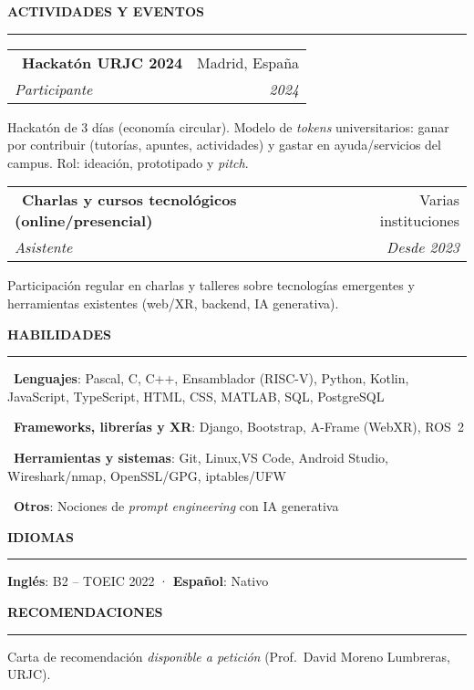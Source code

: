 \documentclass[10pt,a4paper]{article}
\makeatletter
\newcommand{\SectionTitle}[1]{%
	\vspace{5pt}%
	{\bfseries\MakeUppercase{#1}}\par
	\rule{\textwidth}{0.5pt}\vspace{3pt}%
}
\newcommand{\EventEntry}[4]{%
	\begingroup\setlength{\tabcolsep}{0pt}\renewcommand{\arraystretch}{0.95}%
	\noindent\begin{tabular*}{\textwidth}{@{}l@{\extracolsep{\fill}}r@{}}
		\textbullet\ \textbf{#1} & #3 \\
		\textit{#2} & \textit{#4} \\
	\end{tabular*}\par\endgroup
}
\newcommand{\EventDesc}[1]{%
	#1\par\vspace{1pt}%
}
\newcommand{\SkillEntry}[2]{%
	\noindent\textbullet\ \textbf{#1}: #2\par\vspace{0pt}%
}
\makeatother
\begin{document}
	\SectionTitle{Actividades y eventos}
	\EventEntry{Hackatón URJC 2024}{Participante}{Madrid, España}{2024}
	\EventDesc{Hackatón de 3 días (economía circular). Modelo de \textit{tokens} universitarios: ganar por contribuir (tutorías, apuntes, actividades) y gastar en ayuda/servicios del campus. Rol: ideación, prototipado y \textit{pitch}.}
	\EventEntry{Charlas y cursos tecnológicos (online/presencial)}{Asistente}{Varias instituciones}{Desde 2023}
	\EventDesc{Participación regular en charlas y talleres sobre tecnologías emergentes y herramientas existentes (web/XR, backend, IA generativa).}
	
	\SectionTitle{Habilidades}
	\SkillEntry{Lenguajes}{Pascal, C, C++, Ensamblador (RISC\mbox{-}V), Python, Kotlin, JavaScript, TypeScript, HTML, CSS, MATLAB, SQL, PostgreSQL}
	\SkillEntry{Frameworks, librerías y XR}{Django, Bootstrap, A-Frame (WebXR), ROS~2}
	\SkillEntry{Herramientas y sistemas}{Git, Linux,VS Code, Android Studio, Wireshark/nmap, OpenSSL/GPG, iptables/UFW}
	\SkillEntry{Otros}{Nociones de \textit{prompt engineering} con IA generativa}
	
	\SectionTitle{Idiomas}\vspace{0pt}
	\noindent \textbf{Inglés}: B2 -- TOEIC 2022 \;·\; \textbf{Español}: Nativo
	
	\SectionTitle{Recomendaciones}\vspace{-3pt}
	{\footnotesize\noindent Carta de recomendación \textit{disponible a petición} (Prof.\ David Moreno Lumbreras, URJC).}
	
\end{document}
